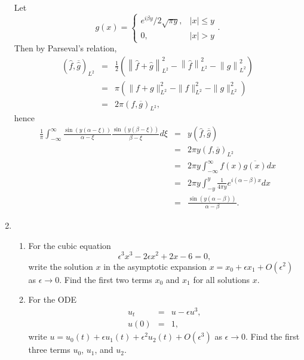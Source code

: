 \documentclass{article}
\begin{document}
\begin{enumerate}
Let
\[g(x) = \begin{cases} e^{i \beta y} / 2 \sqrt{\pi y}, & |x| \leq y \\ 0, & |x| > y \end{cases}.\]
Then by Parseval's relation,
\begin{eqnarray*}
\left( \widehat{f}, \overline{\widehat{g}} \right)_{L^2}
& = & \frac{1}{2} \left( \left\| \widehat{f} + \widehat{g} \right\|_{L^2}^2 - \left\| \widehat{f} \right\|_{L^2}^2 - \left\| \widehat{g} \right\|_{L^2}^2 \right) \\
& = & \pi \left( \|f + g\|_{L^2}^2 - \|f\|_{L^2}^2 - \|g\|_{L^2}^2 \right) \\
& = & 2 \pi \left( f, \overline{g} \right)_{L^2},
\end{eqnarray*}
hence
\begin{eqnarray*}
\frac{1}{\pi} \int_{-\infty}^{\infty} \frac{\sin(y(\alpha - \xi))}{\alpha - \xi} \frac{\sin(y(\beta - \xi))}{\beta - \xi} d\xi
& = & y \left( \widehat{f}, \overline{\widehat{g}} \right) \\
& = & 2 \pi y \left( f, \overline{g} \right)_{L^2} \\
& = & 2 \pi y \int_{-\infty}^{\infty} f(x) \overline{g(x)} dx \\
& = & 2 \pi y \int_{-y}^y \frac{1}{4 \pi y} e^{i (\alpha - \beta) x} dx \\
& = & \frac{\sin(y(\alpha - \beta))}{\alpha - \beta}.
\end{eqnarray*}



\item

\begin{enumerate}
\item For the cubic equation
\[\epsilon^3 x^3 - 2 \epsilon x^2 + 2 x - 6 = 0,\]
write the solution \(x\) in the asymptotic expansion \(x = x_0 + \epsilon x_1 + O(\epsilon^2)\) as \(\epsilon \to 0\).  Find the first two terms \(x_0\) and \(x_1\) for all solutions \(x\).

\item For the ODE
\begin{eqnarray*}
u_t & = & u - \epsilon u^3, \\
u(0) & = & 1,
\end{eqnarray*}
write \(u = u_0(t) + \epsilon u_1(t) + \epsilon^2 u_2(t) + O(\epsilon^3)\) as \(\epsilon \to 0\).  Find the first three terms \(u_0\), \(u_1\), and \(u_2\).

\end{enumerate}


\end{enumerate}
\end{document}
